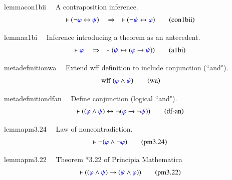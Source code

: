 \begin{restatable}{lemma}{con1bii}~~ A contraposition inference.  
\begin{align}
\vdash ( \lnot \mw{\varphi} \leftrightarrow \mw{\psi} )\quad\Rightarrow\quad
    \vdash ( \lnot \mw{\psi} \leftrightarrow \mw{\varphi}
    )\label{eq:con1bii}\tag{con1bii}
\end{align}
\end{restatable}

\begin{restatable}{lemma}{a1bi}~~ Inference introducing a theorem as an
antecedent.  
\begin{align}
\vdash \mw{\varphi}\quad\Rightarrow\quad \vdash ( \mw{\psi} \leftrightarrow (
    \mw{\varphi} \rightarrow \mw{\psi} ) )\label{eq:a1bi}\tag{a1bi}
\end{align}
\end{restatable}

\begin{restatable}{metadefinition}{wa}~~ Extend wff definition to include conjunction
(``and").
\begin{align}
\,\mathrm{wff}~ ( \mw{\varphi} \wedge \mw{\psi} )\label{eq:wa}\tag{wa}
\end{align}
\end{restatable}

\begin{restatable}{metadefinition}{dfan}~~ Define conjunction (logical ``and"). 
\begin{align}
\vdash ( ( \mw{\varphi} \wedge \mw{\psi} ) \leftrightarrow \lnot ( \mw{\varphi}
    \rightarrow \lnot \mw{\psi} ) )\label{eq:df-an}\tag{df-an}
\end{align}
\end{restatable}

\begin{restatable}{lemma}{pm3.24}~~ Law of noncontradiction.  
\begin{align}
\vdash \lnot ( \mw{\varphi} \wedge \lnot \mw{\varphi}
    )\label{eq:pm3.24}\tag{pm3.24}
\end{align}
\end{restatable}

\begin{restatable}{lemma}{pm3.22}~~ Theorem *3.22 of Principia Mathematica
\begin{align}
\vdash ( ( \mw{\varphi} \wedge \mw{\psi} ) \rightarrow ( \mw{\psi} \wedge
    \mw{\varphi} ) )\label{eq:pm3.22}\tag{pm3.22}
\end{align}
\end{restatable}

